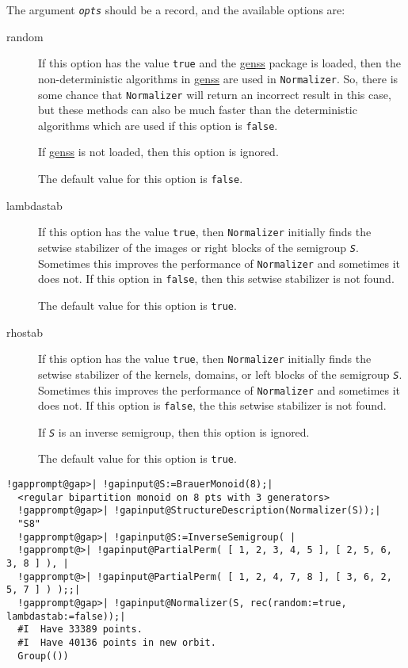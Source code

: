 \documentclass[a4paper,11pt]{report}
\begin{document}
{{{ The argument \mbox{\texttt{\mdseries\slshape opts}} should be a record, and the available options are: 
\begin{description}
\item[{random}]  If this option has the value \texttt{true} and the \href{ http://www-groups.mcs.st-and.ac.uk/~neunhoef/Computer/Software/Gap/genss.html } {genss} package is loaded, then the non-deterministic algorithms in \href{ http://www-groups.mcs.st-and.ac.uk/~neunhoef/Computer/Software/Gap/genss.html } {genss} are used in \texttt{Normalizer}. So, there is some chance that \texttt{Normalizer} will return an incorrect result in this case, but these methods can also be
much faster than the deterministic algorithms which are used if this option is \texttt{false}. 

 If \href{ http://www-groups.mcs.st-and.ac.uk/~neunhoef/Computer/Software/Gap/genss.html } {genss} is not loaded, then this option is ignored. 

 The default value for this option is \texttt{false}. 
\item[{lambdastab}]  If this option has the value \texttt{true}, then \texttt{Normalizer} initially finds the setwise stabilizer of the images or right blocks of the
semigroup \mbox{\texttt{\mdseries\slshape S}}. Sometimes this improves the performance of \texttt{Normalizer} and sometimes it does not. If this option in \texttt{false}, then this setwise stabilizer is not found. 

 The default value for this option is \texttt{true}. 
\item[{rhostab}]  If this option has the value \texttt{true}, then \texttt{Normalizer} initially finds the setwise stabilizer of the kernels, domains, or left blocks
of the semigroup \mbox{\texttt{\mdseries\slshape S}}. Sometimes this improves the performance of \texttt{Normalizer} and sometimes it does not. If this option is \texttt{false}, the this setwise stabilizer is not found. 

 If \mbox{\texttt{\mdseries\slshape S}} is an inverse semigroup, then this option is ignored.

 The default value for this option is \texttt{true}. 
\end{description}
 
\begin{Verbatim}[commandchars=!@|,fontsize=\small,frame=single,label=Example]
  !gapprompt@gap>| !gapinput@S:=BrauerMonoid(8);|
  <regular bipartition monoid on 8 pts with 3 generators>
  !gapprompt@gap>| !gapinput@StructureDescription(Normalizer(S));|
  "S8"
  !gapprompt@gap>| !gapinput@S:=InverseSemigroup( |
  !gapprompt@>| !gapinput@PartialPerm( [ 1, 2, 3, 4, 5 ], [ 2, 5, 6, 3, 8 ] ), |
  !gapprompt@>| !gapinput@PartialPerm( [ 1, 2, 4, 7, 8 ], [ 3, 6, 2, 5, 7 ] ) );;|
  !gapprompt@gap>| !gapinput@Normalizer(S, rec(random:=true, lambdastab:=false));|
  #I  Have 33389 points.
  #I  Have 40136 points in new orbit.
  Group(())
\end{Verbatim}
 }

}}
\end{document}
